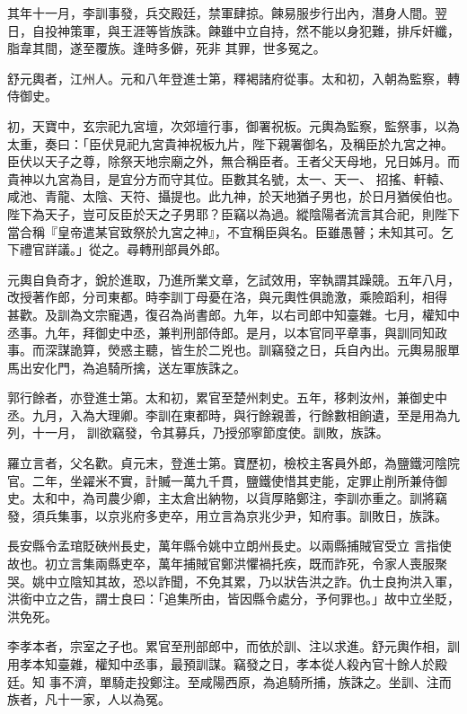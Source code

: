 \begin{pinyinscope}
 其年十一月，李訓事發，兵交殿廷，禁軍肆掠。餗易服步行出內，潛身人間。翌日，自投神策軍，與王涯等皆族誅。餗雖中立自持，然不能以身犯難，排斥奸纖，脂韋其間，遂至覆族。逢時多僻，死非
 其罪，世多冤之。



 舒元輿者，江州人。元和八年登進士第，釋褐諸府從事。太和初，入朝為監察，轉侍御史。



 初，天寶中，玄宗祀九宮壇，次郊壇行事，御署祝板。元輿為監察，監祭事，以為太重，奏曰：「臣伏見祀九宮貴神祝板九片，陛下親署御名，及稱臣於九宮之神。臣伏以天子之尊，除祭天地宗廟之外，無合稱臣者。王者父天母地，兄日姊月。而貴神以九宮為目，是宜分方而守其位。臣數其名號，太一、天一、
 招搖、軒轅、咸池、青龍、太陰、天符、攝提也。此九神，於天地猶子男也，於日月猶侯伯也。陛下為天子，豈可反臣於天之子男耶？臣竊以為過。縱陰陽者流言其合祀，則陛下當合稱『皇帝遣某官致祭於九宮之神』，不宜稱臣與名。臣雖愚瞽；未知其可。乞下禮官詳議。」從之。尋轉刑部員外郎。



 元輿自負奇才，銳於進取，乃進所業文章，乞試效用，宰執謂其躁競。五年八月，改授著作郎，分司東都。時李訓丁母憂在洛，與元輿性俱詭激，乘險蹈利，相得
 甚歡。及訓為文宗寵遇，復召為尚書郎。九年，以右司郎中知臺雜。七月，權知中丞事。九年，拜御史中丞，兼判刑部侍郎。是月，以本官同平章事，與訓同知政事。而深謀詭算，熒惑主聽，皆生於二兇也。訓竊發之日，兵自內出。元輿易服單馬出安化門，為追騎所擒，送左軍族誅之。



 郭行餘者，亦登進士第。太和初，累官至楚州刺史。五年，移刺汝州，兼御史中丞。九月，入為大理卿。李訓在東都時，與行餘親善，行餘數相餉遺，至是用為九列，十一月，
 訓欲竊發，令其募兵，乃授邠寧節度使。訓敗，族誅。



 羅立言者，父名歡。貞元末，登進士第。寶歷初，檢校主客員外郎，為鹽鐵河陰院官。二年，坐糴米不實，計贓一萬九千貫，鹽鐵使惜其吏能，定罪止削所兼侍御史。太和中，為司農少卿，主太倉出納物，以貨厚賂鄭注，李訓亦重之。訓將竊發，須兵集事，以京兆府多吏卒，用立言為京兆少尹，知府事。訓敗日，族誅。



 長安縣令孟琯貶硤州長史，萬年縣令姚中立朗州長史。以兩縣捕賊官受立
 言指使故也。初立言集兩縣吏卒，萬年捕賊官鄭洪懼禍托疾，既而詐死，令家人喪服聚哭。姚中立陰知其故，恐以詐聞，不免其累，乃以狀告洪之詐。仇士良拘洪入軍，洪銜中立之告，謂士良曰：「追集所由，皆因縣令處分，予何罪也。」故中立坐貶，洪免死。



 李孝本者，宗室之子也。累官至刑部郎中，而依於訓、注以求進。舒元輿作相，訓用孝本知臺雜，權知中丞事，最預訓謀。竊發之日，孝本從人殺內官十餘人於殿廷。知
 事不濟，單騎走投鄭注。至咸陽西原，為追騎所捕，族誅之。坐訓、注而族者，凡十一家，人以為冤。




\end{pinyinscope}
